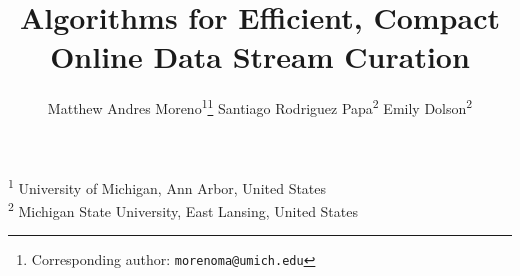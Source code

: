 \title{ Algorithms for Efficient, Compact Online Data Stream Curation }
\author{
    Matthew Andres Moreno\textsuperscript{1}\thanks{Corresponding author: \texttt{morenoma@umich.edu}} \quad
    Santiago Rodriguez Papa\textsuperscript{2} \quad
    Emily Dolson\textsuperscript{2}
}
\date{}

\newcommand{\affil}[1]{\textsuperscript{#1}}
\newcommand{\affiliations}{
    \affil{1} University of Michigan, Ann Arbor, United States \\
    \affil{2} Michigan State University, East Lansing, United States
}

\maketitle

\begin{center}
\affiliations
\end{center}


